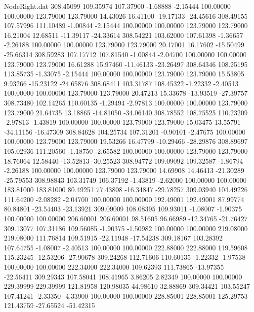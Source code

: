 \begin{filecontents}{NodeRight.dat}
 308.45099  109.35974  107.37900    -1.68888   -2.15444  100.00000  100.00000  123.79000  123.79000   14.43026   16.41100  -19.17133  -24.45616
 308.49155  107.57996  111.10489    -1.00844   -2.15444  100.00000  100.00000  123.79000  123.79000   16.21004   12.68511  -11.39117  -24.33614
 308.54221  103.62000  107.61398    -1.36657   -2.26188  100.00000  100.00000  123.79000  123.79000   20.17001   16.17602  -15.50499  -25.66314
 308.59283  107.17712  107.81540    -1.00844   -2.04700  100.00000  100.00000  123.79000  123.79000   16.61288   15.97460  -11.46133  -23.26497
 308.64346  108.25195  113.85735    -1.33075   -2.15444  100.00000  100.00000  123.79000  123.79000   15.53805    9.93266  -15.23122  -24.65876
 308.68411  103.31787  108.45322    -1.22332   -2.40513  100.00000  100.00000  123.79000  123.79000   20.47213   15.33678  -13.93519  -27.39757
 308.73480  102.14265  110.60135    -1.29494   -2.97813  100.00000  100.00000  123.79000  123.79000   21.64735   13.18865  -14.81050  -34.06140
 308.78552  108.75525  110.23209    -2.97813   -1.43819  100.00000  100.00000  123.79000  123.79000   15.03475   13.55791  -34.11156  -16.47309
 308.84628  104.25734  107.31201    -0.90101   -2.47675  100.00000  100.00000  123.79000  123.79000   19.53266   16.47799  -10.29466  -28.29876
 308.89697  105.02936  111.20560    -1.18750   -2.65582  100.00000  100.00000  123.79000  123.79000   18.76064   12.58440  -13.52813  -30.25523
 308.94772  109.09092  109.32587    -1.86794   -2.26188  100.00000  100.00000  123.79000  123.79000   14.69908   14.46413  -21.30289  -25.79553
 308.98843  103.31749  106.37192    -1.43819   -2.62000  100.00000  100.00000  183.81000  183.81000   80.49251   77.43808  -16.34847  -29.78257
 309.03940  104.49226  111.64200    -2.08282   -2.04700  100.00000  100.00000  192.49001  192.49001   87.99774   80.84801  -23.54403  -23.13921
 309.09009  108.08395  109.93011    -1.08007   -1.90375  100.00000  100.00000  206.60001  206.60001   98.51605   96.66989  -12.34765  -21.76427
 309.13077  107.31186  109.56085    -1.90375   -1.50982  100.00000  100.00000  219.08000  219.08000  111.76814  109.51915  -22.11948  -17.54238
 309.18167  103.28392  107.64755    -1.08007   -2.40513  100.00000  100.00000  222.88000  222.88000  119.59608  115.23245  -12.53206  -27.90678
 309.24268  112.71606  110.60135    -1.22332   -1.97538  100.00000  100.00000  222.34000  222.34000  109.62393  111.73865  -13.97355  -22.56411
 309.29343  107.58041  108.41965     3.86205    2.82349  100.00000  100.00000  229.39999  229.39999  121.81958  120.98035   44.98610   32.88869
 309.34421  103.55247  107.41241    -2.33350   -4.33900  100.00000  100.00000  228.85001  228.85001  125.29753  121.43759  -27.65524  -51.42315

\end{filecontents}

